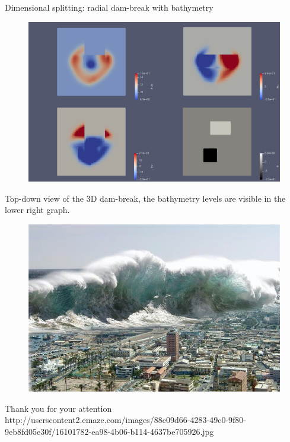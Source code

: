 \documentclass[shortpres]{beamer}
\newcommand{\imgfullscale}{0.75}
\begin{document}
\begin{frame}{Dimensional splitting: radial dam-break with bathymetry}
		\begin{figure}
			\includegraphics[clip, width=\imgfullscale\linewidth]{img/2d_obstacle.png}
		\end{figure}
		Top-down view of the 3D dam-break, \newline the bathymetry levels are visible in the lower right graph. 
		
\end{frame}

\begin{frame}{}
	\begin{figure}
		\includegraphics[clip, width=\imgfullscale\linewidth]{img/tsunami.jpg}
	\end{figure}
	\centering
	Thank you for your attention
	\\
	\vfill
	\flushleft
	{\fontsize{5}{5} \selectfont http://userscontent2.emaze.com/images/88c09d66-4283-49c0-9f80-9eb8fd05e30f/16101782-ea98-4b06-b114-4637be705926.jpg}
\end{frame}
\end{document}
